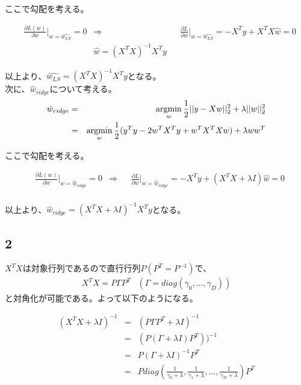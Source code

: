 \documentclass[a4j,11pt]{jarticle}
\newcommand{\argmin}{\mathop{\rm argmin}\limits}
\begin{document}
ここで勾配を考える。

\begin{equation}
    \begin{aligned}
        & \frac{\partial L(w)}{\partial w}|_{w=\hat{w_{LS}}} = 0
        &\Rightarrow
        &&\frac{\partial L}{\partial w}|_{w=\hat{w_{LS}}} = -X^Ty + X^TX\hat{w} = 0\\
        &&\hat{w} = (X^TX)^{-1}X^Ty
    \end{aligned}
\end{equation}

以上より、$\hat{w_{LS}} = (X^TX)^{-1}X^Ty$となる。\\

次に、$\hat{w}_{ridge}$について考える。
\begin{eqnarray}
    \hat{w}_{ridge} &=& \argmin_{w} \frac{1}{2}||y-Xw||^2_2 + \lambda ||w||^2_2\\
    &=& \argmin_{w} \frac{1}{2}(y^Ty-2w^TX^Ty + w^TX^TXw) + \lambda ww^T
\end{eqnarray}

ここで勾配を考える。

\begin{equation}
    \begin{aligned}
        & \frac{\partial L(w)}{\partial w}|_{w=\hat{w}_{ridge}} = 0
        &\Rightarrow
        &&\frac{\partial L}{\partial w}|_{w=\hat{w}_{ridge}} = -X^Ty + (X^TX + \lambda I) \hat{w}= 0\\
    \end{aligned}
\end{equation}

以上より、$\hat{w}_{ridge} = (X^TX + \lambda I)^{-1}X^Ty$となる。

\subsection*{2}
$X^TX$は対象行列であるので直行行列$P(P^T = P^{-1})$で、
\begin{equation}
    \begin{aligned}
        X^TX = P\Gamma P^T 
        &(\Gamma = diag(\gamma_0,...,\gamma_D))
    \end{aligned}
\end{equation}
と対角化が可能である。よって以下のようになる。

\begin{eqnarray*}
    (X^TX + \lambda I)^{-1} &=& (P\Gamma P^T + \lambda I)^{-1}\\
    &=& \left( P(\Gamma + \lambda I)P^T \right))^{-1}\\
    &=& P(\Gamma + \lambda I )^{-1}P^T\\
    &=& Pdiag(\frac{1}{\gamma_0 + \lambda},\frac{1}{\gamma_1 + \lambda},...,\frac{1}{\gamma_D + \lambda})P^T
\end{eqnarray*}
\end{document}
